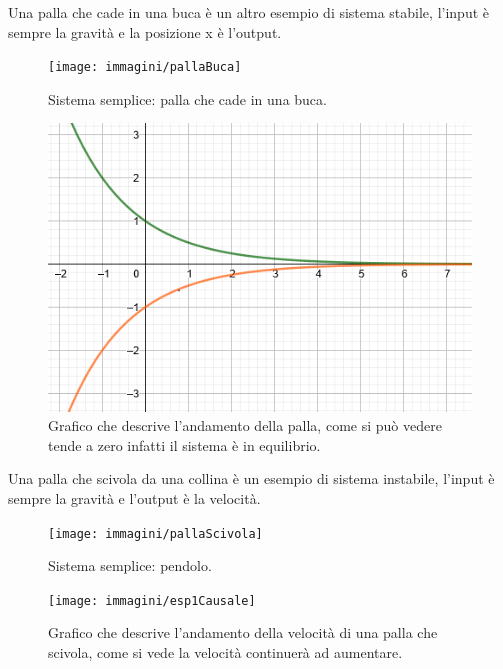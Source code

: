 
	\begin{nexample}
			Una palla che cade in una buca è un altro esempio di sistema stabile, l'input è sempre la gravità e la posizione x è l'output. 
		
		\begin{figure}[H]
			\centering
			\texttt{[image: immagini/pallaBuca]}
			\caption{ Sistema semplice: palla che cade in una buca. }
			\label{fig: pallaBuca}
		\end{figure}
		
		\begin{figure}[H]
			\centering
			\includegraphics[scale=0.5]{immagini/esp3}
			\caption{ Grafico che descrive l'andamento della palla, come si può vedere tende a zero infatti il sistema è in equilibrio. }
			\label{fig: esp3}
		\end{figure}
	\end{nexample}
	
	\begin{nexample}
			Una palla che scivola da una collina è un esempio di sistema instabile, l'input è sempre la gravità e l'output è la velocità.
	
		\begin{figure}[H]
			\centering
			\texttt{[image: immagini/pallaScivola]}
			\caption{ Sistema semplice: pendolo. }
			\label{fig: pallaScivola}
		\end{figure}
	
		\begin{figure}[H]
			\centering
			\texttt{[image: immagini/esp1Causale]}
			\caption{ Grafico che descrive l'andamento della velocità di una palla che scivola, come si vede la velocità continuerà ad aumentare. }
			\label{fig: esp1Causale}
		\end{figure}

	\end{nexample}


